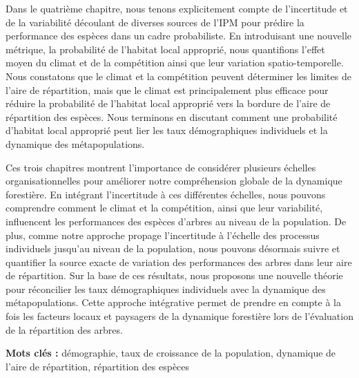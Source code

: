 Dans le quatrième chapitre, nous tenons explicitement compte de l'incertitude et de la variabilité découlant de diverses sources de l'IPM pour prédire la performance des espèces dans un cadre probabiliste. En introduisant une nouvelle métrique, la probabilité de l'habitat local approprié, nous quantifions l'effet moyen du climat et de la compétition ainsi que leur variation spatio-temporelle. Nous constatons que le climat et la compétition peuvent déterminer les limites de l'aire de répartition, mais que le climat est principalement plus efficace pour réduire la probabilité de l'habitat local approprié vers la bordure de l'aire de répartition des espèces. Nous terminons en discutant comment une probabilité d'habitat local approprié peut lier les taux démographiques individuels et la dynamique des métapopulations.

Ces trois chapitres montrent l'importance de considérer plusieurs échelles organisationnelles pour améliorer notre compréhension globale de la dynamique forestière. En intégrant l'incertitude à ces différentes échelles, nous pouvons comprendre comment le climat et la compétition, ainsi que leur variabilité, influencent les performances des espèces d'arbres au niveau de la population. De plus, comme notre approche propage l'incertitude à l'échelle des processus individuels jusqu'au niveau de la population, nous pouvons désormais suivre et quantifier la source exacte de variation des performances des arbres dans leur aire de répartition. Sur la base de ces résultats, nous proposons une nouvelle théorie pour réconcilier les taux démographiques individuels avec la dynamique des métapopulations. Cette approche intégrative permet de prendre en compte à la fois les facteurs locaux et paysagers de la dynamique forestière lors de l'évaluation de la répartition des arbres.

\textbf{Mots clés :} démographie, taux de croissance de la population, dynamique de l'aire de répartition, répartition des espèces


